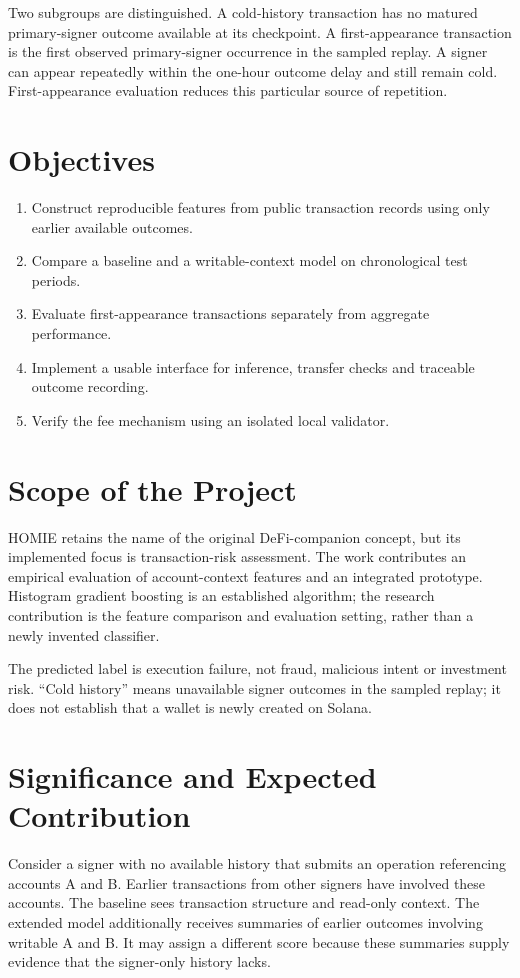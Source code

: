 \documentclass[12pt,a4paper,oneside]{report}
\begin{document}
Two subgroups are distinguished. A cold-history transaction has no matured primary-signer outcome available at its checkpoint. A first-appearance transaction is the first observed primary-signer occurrence in the sampled replay. A signer can appear repeatedly within the one-hour outcome delay and still remain cold. First-appearance evaluation reduces this particular source of repetition.

\section{Objectives}
\begin{enumerate}
\item Construct reproducible features from public transaction records using only earlier available outcomes.
\item Compare a baseline and a writable-context model on chronological test periods.
\item Evaluate first-appearance transactions separately from aggregate performance.
\item Implement a usable interface for inference, transfer checks and traceable outcome recording.
\item Verify the fee mechanism using an isolated local validator.
\end{enumerate}

\section{Scope of the Project}
HOMIE retains the name of the original DeFi-companion concept, but its implemented focus is transaction-risk assessment. The work contributes an empirical evaluation of account-context features and an integrated prototype. Histogram gradient boosting is an established algorithm; the research contribution is the feature comparison and evaluation setting, rather than a newly invented classifier.

The predicted label is execution failure, not fraud, malicious intent or investment risk. ``Cold history'' means unavailable signer outcomes in the sampled replay; it does not establish that a wallet is newly created on Solana.

\section{Significance and Expected Contribution}
Consider a signer with no available history that submits an operation referencing accounts A and B. Earlier transactions from other signers have involved these accounts. The baseline sees transaction structure and read-only context. The extended model additionally receives summaries of earlier outcomes involving writable A and B. It may assign a different score because these summaries supply evidence that the signer-only history lacks.
\end{document}
